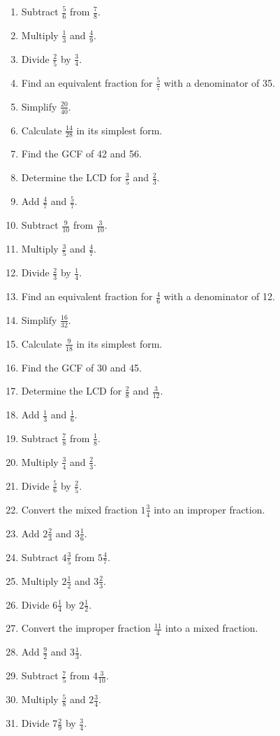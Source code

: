 \documentclass[14pt]{article}
\begin{document}
\begin{enumerate}
\item Subtract $\frac{5}{6}$ from $\frac{7}{8}$.
\item Multiply $\frac{1}{3}$ and $\frac{4}{9}$.
\item Divide $\frac{2}{5}$ by $\frac{3}{4}$.
\item Find an equivalent fraction for $\frac{5}{7}$ with a denominator of 35.
\item Simplify $\frac{20}{40}$.
\item Calculate $\frac{14}{28}$ in its simplest form.
\item Find the GCF of 42 and 56.
\item Determine the LCD for $\frac{3}{5}$ and $\frac{2}{3}$.
\item Add $\frac{4}{7}$ and $\frac{5}{7}$.
\item Subtract $\frac{9}{10}$ from $\frac{3}{10}$.
\item Multiply $\frac{3}{5}$ and $\frac{4}{7}$.
\item Divide $\frac{2}{3}$ by $\frac{1}{4}$.
\item Find an equivalent fraction for $\frac{4}{6}$ with a denominator of 12.
\item Simplify $\frac{16}{32}$.
\item Calculate $\frac{9}{18}$ in its simplest form.
\item Find the GCF of 30 and 45.
\item Determine the LCD for $\frac{2}{8}$ and $\frac{3}{12}$.
\item Add $\frac{1}{3}$ and $\frac{1}{6}$.
\item Subtract $\frac{7}{8}$ from $\frac{1}{8}$.
\item Multiply $\frac{3}{4}$ and $\frac{2}{3}$.
\item Divide $\frac{5}{6}$ by $\frac{2}{5}$.
\item Convert the mixed fraction $1\frac{3}{4}$ into an improper fraction.
\item Add $2\frac{2}{3}$ and $3\frac{1}{6}$.
\item Subtract $4\frac{3}{5}$ from $5\frac{4}{7}$.
\item Multiply $2\frac{1}{2}$ and $3\frac{2}{3}$.
\item Divide $6\frac{1}{4}$ by $2\frac{1}{2}$.
\item Convert the improper fraction $\frac{11}{4}$ into a mixed fraction.
\item Add $\frac{9}{2}$ and $3\frac{1}{3}$.
\item Subtract $\frac{7}{5}$ from $4\frac{3}{10}$.
\item Multiply $\frac{5}{8}$ and $2\frac{3}{4}$.
\item Divide $7\frac{2}{9}$ by $\frac{3}{4}$.
\end{enumerate}
\end{document}
